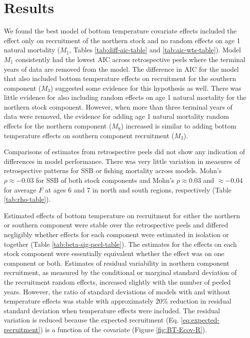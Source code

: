 \documentclass[
]{article}
\begin{document}
\hypertarget{results}{%
\section*{Results}\label{results}}

We found the best model of bottom temperature covariate effects included
the effect only on recruitment of the northern stock and no random
effects on age 1 natural mortality (\(M_1\), Tables
\ref{tab:diff-aic-table} and \ref{tab:aic-wts-table}). Model \(M_1\)
consistently had the lowest AIC across retrospective peels where the
terminal years of data are removed from the model. The difference in AIC
for the model that also included bottom temperature effects on
recruitment for the southern component (\(M_3\)) suggested some evidence
for this hypothesis as well. There was little evidence for also
including random effects on age 1 natural mortality for the northern
stock component. However, when more than three terminal years of data
were removed, the evidence for adding age 1 natural mortality random
effects for the northern component (\(M_8\)) increased is similar to
adding bottom temperature effects on southern component recruitment
(\(M_3\)).

Comparisons of estimates from retrospective peels did not show any
indication of differences in model performance. There was very little
variation in measures of retrospective patterns for SSB or fishing
mortality across models. Mohn's \(\rho \approx -0.03\) for SSB of both
stock components and Mohn's \(\rho \approx 0.03\) and \(\approx -0.04\)
for average \(F\) at ages 6 and 7 in north and south regions,
respectively (Table \ref{tab:rho-table}).

Estimated effects of bottom temperature on recruitment for either the
northern or southern component were stable over the retrospective peels
and differed negligibly whether effects for each component were
estimated in isolation or together (Table
\ref{tab:beta-sig-peel-table}). The estimates for the effects on each
stock component were essentially equivalent whether the effect was on
one component or both. Estimates of residual variability in northern
component recruitment, as measured by the conditional or marginal
standard deviation of the recruitment random effects, increased slightly
with the number of peeled years. However, the ratio of standard
deviations of models with and without temperature effects was stable
with approximately 20\% reduction in residual standard deviation when
temperature effects were included. The residual variation is reduced
because the expected recruitment (Eq. \ref{eq:expected-recruitment}) is
a function of the covariate (Figure \ref{fig:BT-Ecov-R}).
\end{document}
